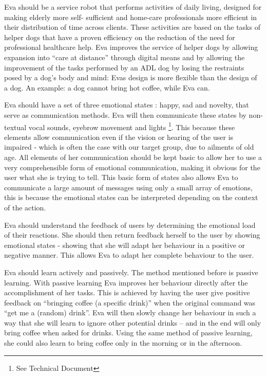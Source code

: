 \documentclass[project_eva.tex]{subfiles}
\begin{document}
Eva should be a service robot that performs activities of daily living, designed for making elderly more self-
sufficient\cite{Forlizzi} and home-care professionals more efficient in their distribution of time across clients. These 
activities are based on the tasks of helper dogs that have a proven efficiency on the reduction of the need for 
professional healthcare help\cite{Diepenhorst}. Eva improves the service of helper dogs by allowing 
expansion into ``care at distance'' \cite{Evers} through digital means and by allowing the improvement of the tasks 
performed by an ADL dog by losing the restraints posed by a dog’s body and mind: Eva\textquotesingle s design is more flexible than the 
design of a dog. An example: a dog cannot bring hot coffee, while Eva can.

Eva should have a set of three emotional states \pageref{sec:Emotion expression}: happy, sad and novelty, that serve as 
communication methods. Eva will then communicate these states by non-textual vocal sounds, eyebrow movement and lights 
\footnote{See Technical Document}. This because these elements allow communication even if the vision or hearing of the 
user is impaired - which is often the case with our target group, due to ailments of old age. All elements of her 
communication should be kept basic to allow her to use a very comprehensible form of emotional communication, making it 
obvious for the user what she is trying to tell. This basic form of states also allows Eva to communicate a large amount of 
messages using only a small array of emotions, this is because the emotional states can be interpreted depending on the 
context of the action.

Eva should understand the feedback of users by determining the emotional load of their reactions. She should then return 
feedback herself to the user by showing emotional states - showing that she will adapt her behaviour in a positive or 
negative manner. This allows Eva to adapt her complete behaviour to the user.

Eva should learn actively and passively. The method mentioned before is passive learning. With passive learning Eva 
improves her behaviour directly after the accomplishment of her tasks. This is achieved by having the user give positive feedback on ``bringing coffee (a specific drink)''  when the original command was ``get me a (random) drink''.  Eva will then slowly change her behaviour in such a way that she will learn to ignore other potential drinks – and in the end will only bring coffee when asked for drinks. Using the same method of passive learning, she could also learn to bring coffee only in the morning or in the afternoon.
\end{document}
